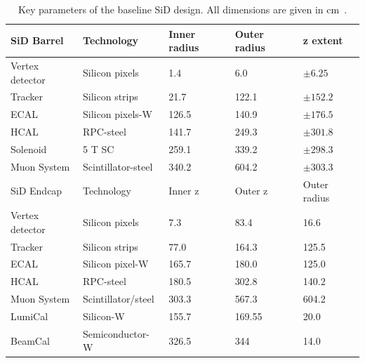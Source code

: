 \begin{table}
\caption[Key parameters of the baseline SiD design]{Key parameters of the baseline SiD design. All dimensions are given in cm~\cite{SiDBkgNote}.}
\label{tab:KeyParametersSiD}
\centering
\begin{tabularx}{0.81\textwidth}{l|llll}
\hline\hline
SiD Barrel & Technology & Inner radius & Outer radius & z extent\\
\hline
Vertex detector & Silicon pixels & 1.4 & 6.0 & $\pm 6.25$ \\
Tracker & Silicon strips & 21.7 & 122.1 & $\pm 152.2$ \\
ECAL & Silicon pixels-W & 126.5 & 140.9 & $\pm 176.5$ \\
HCAL & RPC-steel & 141.7 & 249.3 & $\pm 301.8$ \\
Solenoid & 5 T SC & 259.1 & 339.2 & $\pm 298.3$ \\
Muon System & Scintillator-steel & 340.2 & 604.2 & $\pm 303.3$ \\
\hline
SiD Endcap & Technology & Inner z & Outer z & Outer radius\\
\hline
Vertex detector & Silicon pixels & 7.3 & 83.4 & 16.6 \\
Tracker & Silicon strips & 77.0 & 164.3 & 125.5 \\
ECAL & Silicon pixel-W & 165.7 & 180.0 & 125.0 \\
HCAL & RPC-steel & 180.5 & 302.8 & 140.2 \\
Muon System & Scintillator/steel & 303.3 & 567.3 & 604.2 \\
LumiCal & Silicon-W & 155.7 & 169.55 &  20.0 \\
BeamCal & Semiconductor-W & 326.5 & 344 & 14.0 \\
\hline\hline
\end{tabularx}
\end{table}
